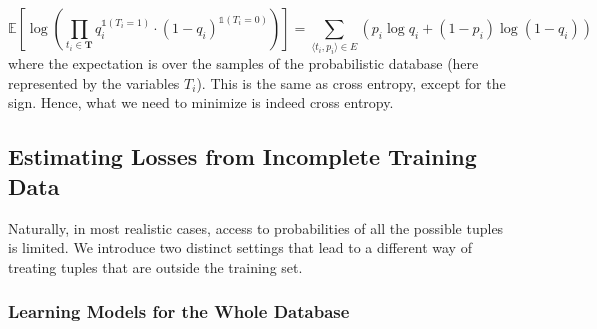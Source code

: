 \documentclass[akbc,twoside,11pt]{article}
\newcounter{example}
\newcommand{\ondrej}[1]{\textcolor{red}{O: {#1}}}
\newcommand{\guy}[1]{\textcolor{red}{G: {#1}}}
\begin{document}
\begin{equation}
    \mathbb{E}\left[ \log{\left( \prod_{ t_i \in \mathbf{T}} q_i^{\mathds{1}(T_i = 1)} \cdot (1-q_i)^{\mathds{1}(T_i = 0)} \right)} \right]
    = \sum_{\langle t_i, p_i \rangle \in E} \left( p_i \log{ q_i} + (1-p_i) \log{\left( 1-q_i \right)} \right)
\end{equation}
where the expectation is over the samples of the probabilistic database (here represented by the variables $T_i$).
This is the same as cross entropy, except for the sign. Hence, what we need to minimize is indeed cross entropy.


\subsection{Estimating Losses from Incomplete Training Data}

Naturally, in most realistic cases, access to probabilities of all the possible tuples is limited. We introduce two distinct settings that lead to a different way of treating tuples that are outside the training set.  %

\subsubsection{Learning Models for the Whole Database}\label{sub:samp}
\end{document}
